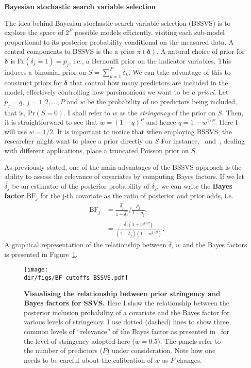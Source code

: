 \textbf{Bayesian stochastic search variable selection}

The idea behind Bayesian stochastic search variable selection (BSSVS) is to explore the space of $2^P$ possible models efficiently, visiting each sub-model proportional to its posterior probability conditional on the measured data.
A central components to BSSVS is the a prior $\pi(\boldsymbol\delta)$.
A natural choice of prior for $\boldsymbol\delta$ is $\text{Pr}(\delta_j = 1) = p_j$, i.e., a Bernoulli prior on the indicator variables.
This induces a binomial prior on $S = \sum_{k=1}^P \delta_k$.
We can take advantage of this to construct priors for $\boldsymbol\delta$ that control how many predictors are included in the model, effectively controlling how parsimonious we want to be \textit{a priori}.
Let $p_j = q, \: j = 1, 2, \ldots, P$ and $w$ be the probability of no predictors being included, that is,  $\text{Pr}(S = 0)$.
I shall refer to $w$ as the \textit{stringency} of the prior on $S$.
Then, it is straightforward to see that $w = (1-q)^P$ and hence $q = 1 - w^{1/P}$.
Here I will use $w = 1/2$.
It is important to notice that when employing BSSVS, the researcher might want to place a prior directly on $S$
For instance,~\cite{Lemey2009} and~\cite{Drummond2010}, dealing with different applications, place a truncated Poisson prior on $S$.

As previously stated, one of the main advantages of the BSSVS approach is the ability to assess the relevance of covariates by computing Bayes factors.
If we let $\hat{\delta_j}$  be an estimator of the posterior probability of $\delta_j$, we can write the \textbf{Bayes factor}  $\text{BF}_j$ for the j-th covariate as the ratio of posterior and prior odds, i.e.
\begin{align}
 \text{BF}_j &= \frac{\hat{\delta_j} }{1-\hat{\delta_j} }/\frac{p_j}{1-p_j}, \\
  &= \frac{\hat{\delta_j} (1 + w^{1/P})}{(1-\hat{\delta_j})(1 - w^{1/P}) }.
\end{align}
A graphical representation of the relationship between $\hat{\delta}$, $w$ and the Bayes factors is presented in Figure~\ref{fig:BFcalibration}.

\begin{figure}[htbp]
  \centering
  \texttt{[image: \\dir/figs/BF\_cutoffs\_BSSVS.pdf]}
  \caption[Visualising the relationship between prior stringency and Bayes factors for SSVS]{\textbf{Visualising the relationship between prior stringency and Bayes factors for SSVS.}
  Here I show the relationship between the posterior inclusion probability of a covariate and the Bayes factor for various levels of stringency.
  I use dotted (dashed) lines to show three common levels of ``relevance'' of the Bayes factor as presented in~\cite{Kass1995} for the level of stringency adopted here ($w = 0.5$).
  The panels refer to the number of predictors ($P$) under consideration.
  Note how one needs to be careful about the calibration of $w$ as $P$ changes.
  }
  \label{fig:BFcalibration}
\end{figure}

